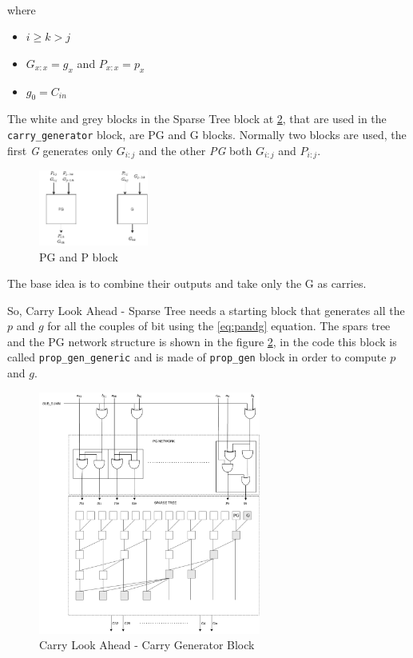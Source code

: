 \begin{itemize}
\begin{align*}
    \end{align*}
    where
    \begin{itemize}
        \itemsep0sp
        \item $i \ge k > j$
        \item $G_{x:x} = g_x$ and $P_{x:x} = p_x$
        \item $g_0 = C_{in}$
    \end{itemize}
    The white and grey blocks in the Sparse Tree block at \ref{fig:pg_network}, that are used in the \texttt{carry\_generator} block, are PG and G blocks.
    Normally two blocks are used, the first \textit{G} generates only $G_{i:j}$ and the other \textit{PG} both $G_{i:j}$ and $P_{i:j}$.
    \begin{figure}[h]
        \centering
        \includegraphics[width=0.32\textwidth]{chapters/5_ExecuteStage/images/PG_and_G.pdf}
        \caption{PG and P block}
        \label{fig:PG_and_G}
    \end{figure}
    The base idea is to combine their outputs and take only the G as carries.
\end{itemize}
So, Carry Look Ahead - Sparse Tree needs a starting block that generates all the $p$ and $g$ for all the couples of bit using the \ref{eq:pandg} equation. The spars tree and the PG network structure is shown in the figure \ref{fig:pg_network}, in the code this block is called \texttt{prop\_gen\_generic} and is made of \texttt{prop\_gen} block in order to compute $p$ and $g$.
\begin{figure}[H]
    \centering
    \includegraphics[width=0.65\textwidth]{chapters/5_ExecuteStage/images/CLA.pdf}
    \caption{Carry Look Ahead - Carry Generator Block}
    \label{fig:pg_network}
\end{figure}
